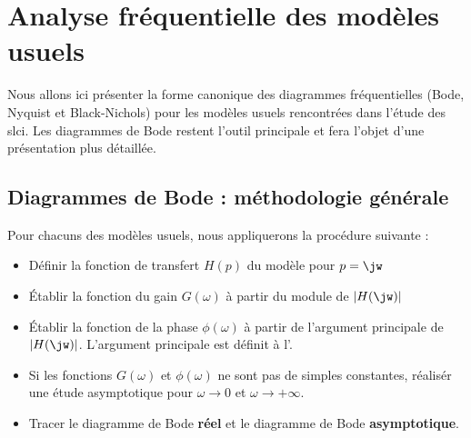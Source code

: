 \newpage

\section{Analyse fréquentielle des modèles usuels}


Nous allons ici présenter la forme canonique des diagrammes fréquentielles (Bode, Nyquist et Black-Nichols) pour 
les modèles usuels rencontrées dans l'étude des \gls{slci}. Les diagrammes de Bode restent l'outil principale et fera 
l'objet d'une présentation plus détaillée.

\subsection{Diagrammes de Bode : méthodologie générale}
Pour chacuns des modèles usuels, nous appliquerons la procédure suivante :
\begin{itemize}
    \item Définir la fonction de transfert $H(p)$ du modèle pour $p=\jw$
    \item \'Etablir la fonction du gain $G(\omega)$ à partir du module de $|H(\jw)|$
    \item \'Etablir la fonction de la phase $\phi(\omega)$ à partir de l'argument principale de $|H(\jw)|$.
          L'argument principale est définit à l'.
    \item Si les fonctions $G(\omega)$ et $\phi(\omega)$ ne sont pas de simples constantes, réalisér une étude
        asymptotique pour $\omega\rightarrow 0$ et $\omega\rightarrow +\infty$.
    \item Tracer le diagramme de Bode \textbf{réel} et le diagramme de Bode \textbf{asymptotique}.
\end{itemize}

